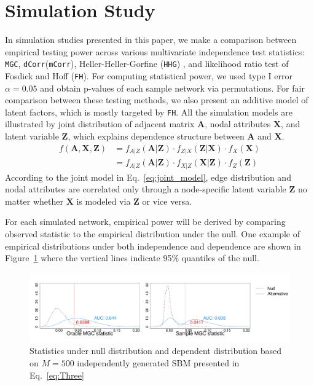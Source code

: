 \documentclass[12pt]{article}
\theoremstyle{definition}
\begin{document}
\section{Simulation Study}
\label{sec:sim}
	
In simulation studies presented in this paper, we make a comparison between empirical testing power across various multivariate independence test statistics: \texttt{MGC}, \texttt{dCorr}(\texttt{mCorr}), Heller-Heller-Gorfine (\texttt{HHG}) \citep{heller2012consistent}, and likelihood ratio test of Fosdick and Hoff (\texttt{FH}). For computing statistical power, we used type I error $\alpha = 0.05$ and obtain p-values of each sample network via permutations. For fair comparison between these testing methods, we also present an additive model of latent factors, which is mostly targeted by \texttt{FH}.  All the simulation models are illustrated by joint distribution of adjacent matrix $\mathbf{A}$, nodal attributes $\mathbf{X}$, and latent variable $\mathbf{Z}$, which explains dependence structure between $\mathbf{A}$ and $\mathbf{X}$. 
\begin{equation}
\begin{split}
f(\mathbf{A}, \mathbf{X}, \mathbf{Z}) & = f_{A | Z}(\mathbf{A} | \mathbf{Z}) \cdot f_{Z | X}(\mathbf{Z} | \mathbf{X}) \cdot f_{X}(\mathbf{X}) 
\\ & = f_{A | Z}(\mathbf{A} | \mathbf{Z}) \cdot  f_{X | Z}(\mathbf{X} | \mathbf{Z} ) \cdot f_{Z} (\mathbf{Z}) 
\end{split}
\label{eq:joint_model}
\end{equation}	
According to the joint model in Eq.~\ref{eq:joint_model}, edge distribution and nodal attributes are correlated only through a node-specific latent variable $\mathbf{Z}$ no matter whether $\mathbf{X}$ is modeled via $\mathbf{Z}$ or vice versa. 

For each simulated network, empirical power will be derived by comparing observed statistic to the empirical distribution under the null. One example of empirical distributions under both independence and dependence are shown in Figure~\ref{fig:density} where the vertical lines indicate 95$\%$ quantiles of the null.
\begin{figure}[H]
	\centering
	\includegraphics[width=7in]{../Figure/density.pdf}
	\caption{Statistics under null distribution and dependent distribution based on $M = 500$ independently generated SBM presented in Eq.~\ref{eq:Three}}
	\label{fig:density}
\end{figure}		
						
\end{document}
